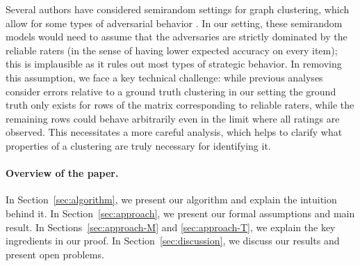 Several authors have considered semirandom settings for graph clustering, which 
allow for some types of adversarial behavior \citep{feige2000finding,
feige2001heuristics,coja2004coloring,krivelevich2006semirandom,
coja2007solving,makarychev2012approximation,chen2014improved,guedon2014community,
moitra2015robust,agarwal2015multisection}. 
In our setting, these semirandom models would need to assume that the adversaries 
are strictly dominated by the reliable raters (in the sense of having lower 
expected accuracy on every item); this is implausible as it rules out 
most types of strategic behavior.
In removing this assumption, we face a key technical challenge: while previous 
analyses consider errors relative to a ground truth clustering 
in our setting 
the ground truth only exists for rows of the matrix corresponding to reliable 
raters, while the remaining rows could behave arbitrarily even in the limit 
where all ratings are observed. This necessitates a more careful analysis, 
which helps to clarify what properties of a clustering are truly necessary 
for identifying it.


\paragraph{Overview of the paper.} In Section~\ref{sec:algorithm}, we 
present our algorithm and explain the intuition behind it.
In Section~\ref{sec:approach}, we present our formal assumptions and main 
result. 
In Sections~\ref{sec:approach-M} and \ref{sec:approach-T}, we explain 
the key ingredients in our proof.
In Section~\ref{sec:discussion}, we discuss our results and 
present open problems.
